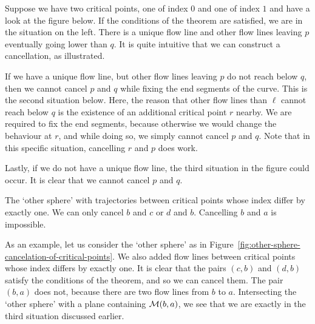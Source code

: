 Suppose we have two critical points, one of index $0$ and one of index $1$ and have a look at the figure below.
If the conditions of the theorem are satisfied, we are in the situation on the left. There is a unique flow line and other flow lines leaving $p$ eventually going lower than $q$. It is quite intuitive that we can construct a cancellation, as illustrated.

If we have a unique flow line, but other flow lines leaving $p$ do not reach below $q$, then we cannot cancel $p$ and $q$ while fixing the end segments of the curve.
This is the second situation below.
Here, the reason that other flow lines than $\ell$ cannot reach below $q$ is the existence of an additional critical point $r$ nearby.
We are required to fix the end segments, because otherwise we would change the behaviour at $r$, and while doing so, we simply cannot cancel $p$ and $q$.
Note that in this specific situation, cancelling $r$ and $p$ does work.

Lastly, if we do not have a unique flow line, the third situation in the figure could occur. It is clear that we cannot cancel $p$ and $q$.

\begin{figure}[H]
    \centering
\end{figure}

\begin{marginfigure}
    \centering
    \caption{The `other sphere' with trajectories between critical points whose index differ by exactly one. We can only cancel $b$ and $c$ or $d$ and $b$. Cancelling $b$ and $a$ is impossible.}
    \label{fig:other-sphere-cancelation-of-critical-points}
\end{marginfigure}
\begin{eg}
    As an example, let us consider the `other sphere' as in Figure~\ref{fig:other-sphere-cancelation-of-critical-points}.
   We also added flow lines between critical points whose index differs by exactly one.
   It is clear that the pairs $(c,b)$ and $(d, b)$ satisfy the conditions of the theorem, and so we can cancel them.
   The pair $(b,a)$ does not, because there are two flow lines from $b$ to $a$. Intersecting the `other sphere' with a plane containing $\mathcal M(b, a)$, we see that we are exactly in the third situation discussed earlier.
\end{eg}

